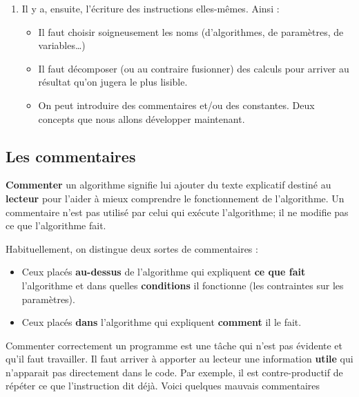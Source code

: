 \begin{enumerate}
		\item
			Il y a, ensuite, l'écriture des instructions elles-mêmes.
			Ainsi :
			\begin{itemize}
			\item
				Il faut choisir soigneusement les noms 
				(d'algorithmes, de paramètres, de variables\dots)
			\item
				Il faut décomposer (ou au contraire fusionner)
				des calculs pour arriver au résultat qu'on jugera
				le plus lisible.
			\item 
				On peut introduire des commentaires et/ou
				des constantes. 
				Deux concepts que nous allons développer maintenant.
			\end{itemize}
			
		\end{enumerate}
				
		\subsection{Les commentaires}
	
			\textbf{Commenter} un algorithme
			signifie lui ajouter du texte explicatif
			destiné au \textbf{lecteur} pour l'aider à mieux
			comprendre le fonctionnement de l'algorithme.
			Un commentaire n'est pas utilisé par celui qui exécute
			l'algorithme; il ne modifie pas ce que l'algorithme fait.
			
			Habituellement, on distingue deux sortes de commentaires :
			\begin{itemize}
			\item
				Ceux placés \textbf{au-dessus} de l'algorithme
				qui expliquent \textbf{ce que fait} l'algorithme
				et dans quelles \textbf{conditions} il fonctionne
				(les contraintes sur les paramètres).
			\item
				Ceux placés \textbf{dans} l'algorithme
				qui expliquent \textbf{comment} il le fait.
			\end{itemize}
			
			Commenter correctement un programme
			est une tâche qui n'est pas évidente et qu'il faut travailler.
			Il faut arriver à apporter au lecteur
			une information \textbf{utile}
			qui n'apparait pas directement dans le code.
			Par exemple, il est contre-productif de répéter
			ce que l'instruction dit déjà.
			Voici quelques mauvais commentaires
			
